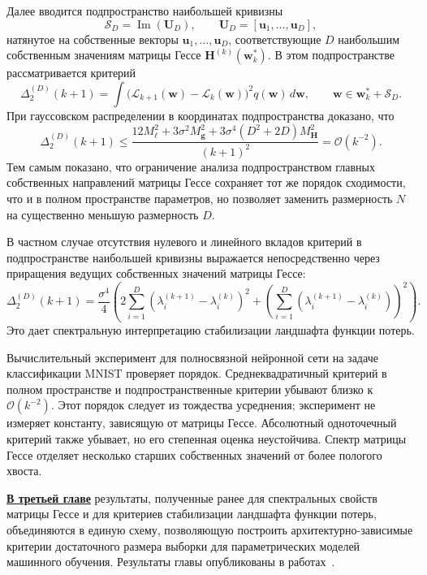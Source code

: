 Далее вводится подпространство наибольшей кривизны
\begin{equation}
\mathcal S_D=\operatorname{Im}(\mathbf U_D),
\qquad
\mathbf U_D=[\mathbf u_1, \dots, \mathbf u_D],
\end{equation}
натянутое на собственные векторы $\mathbf u_1, \dots, \mathbf u_D$, соответствующие $D$ наибольшим собственным значениям матрицы Гессе $\mathbf H^{(k)}(\mathbf w_k^*)$. В этом подпространстве рассматривается критерий
\begin{equation}
\Delta_2^{(D)}(k+1)
=
\int
\big(
\mathcal L_{k+1}(\mathbf w)-\mathcal L_k(\mathbf w)
\big)^2
q(\mathbf w)\,d\mathbf w,
\qquad
\mathbf w\in \mathbf w_k^*+\mathcal S_D.
\end{equation}
При гауссовском распределении в координатах подпространства доказано, что
\begin{equation}
\Delta_2^{(D)}(k+1)
\le
\frac{
12M_\ell^2
+
3\sigma^2M_{\mathbf g}^2
+
3\sigma^4(D^2+2D)M_{\mathbf H}^2
}{(k+1)^2}
=
\mathcal O(k^{-2}).
\end{equation}
Тем самым показано, что ограничение анализа подпространством главных собственных направлений матрицы Гессе сохраняет тот же порядок сходимости, что и в полном пространстве параметров, но позволяет заменить размерность $N$ на существенно меньшую размерность $D$.

В частном случае отсутствия нулевого и линейного вкладов критерий в подпространстве наибольшей кривизны выражается непосредственно через приращения ведущих собственных значений матрицы Гессе:
\begin{equation}
\Delta_{2}^{(D)}(k+1)
=
\frac{\sigma^4}{4}
\left(
2\sum_{i=1}^{D}
\left(
\lambda_i^{(k+1)}-\lambda_i^{(k)}
\right)^2
+
\left(
\sum_{i=1}^{D}
\left(
\lambda_i^{(k+1)}-\lambda_i^{(k)}
\right)
\right)^2
\right).
\end{equation}
Это дает спектральную интерпретацию стабилизации ландшафта функции потерь.

Вычислительный эксперимент для полносвязной нейронной сети на задаче классификации MNIST проверяет порядок. Среднеквадратичный критерий в полном пространстве и подпространственные критерии убывают близко к $\mathcal O(k^{-2})$. Этот порядок следует из тождества усреднения; эксперимент не измеряет константу, зависящую от матрицы Гессе. Абсолютный одноточечный критерий также убывает, но его степенная оценка неустойчива. Спектр матрицы Гессе отделяет несколько старших собственных значений от более пологого хвоста.

\underline{\textbf{В третьей главе}} результаты, полученные ранее для спектральных свойств матрицы Гессе и для критериев стабилизации ландшафта функции потерь, объединяются в единую схему, позволяющую построить архитектурно-зависимые критерии достаточного размера выборки для параметрических моделей машинного обучения. Результаты главы опубликованы в работах~\cite{kiselev2025conf67mipt,kiselev2025mmro}.

